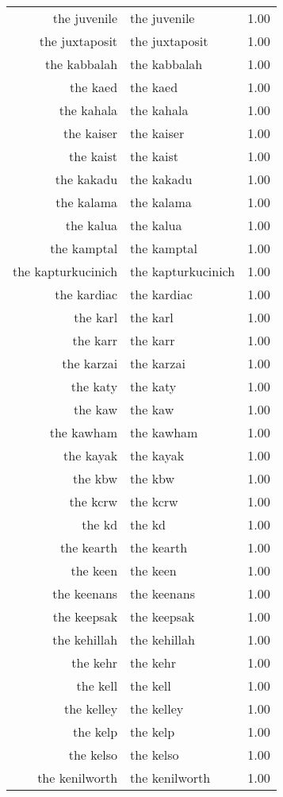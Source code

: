 \begin{table}[ht]
\begin{tabular}{rlr}
  the juvenile & the juvenile & 1.00 \\ 
  the juxtaposit & the juxtaposit & 1.00 \\ 
  the kabbalah & the kabbalah & 1.00 \\ 
  the kaed & the kaed & 1.00 \\ 
  the kahala & the kahala & 1.00 \\ 
  the kaiser & the kaiser & 1.00 \\ 
  the kaist & the kaist & 1.00 \\ 
  the kakadu & the kakadu & 1.00 \\ 
  the kalama & the kalama & 1.00 \\ 
  the kalua & the kalua & 1.00 \\ 
  the kamptal & the kamptal & 1.00 \\ 
  the kapturkucinich & the kapturkucinich & 1.00 \\ 
  the kardiac & the kardiac & 1.00 \\ 
  the karl & the karl & 1.00 \\ 
  the karr & the karr & 1.00 \\ 
  the karzai & the karzai & 1.00 \\ 
  the katy & the katy & 1.00 \\ 
  the kaw & the kaw & 1.00 \\ 
  the kawham & the kawham & 1.00 \\ 
  the kayak & the kayak & 1.00 \\ 
  the kbw & the kbw & 1.00 \\ 
  the kcrw & the kcrw & 1.00 \\ 
  the kd & the kd & 1.00 \\ 
  the kearth & the kearth & 1.00 \\ 
  the keen & the keen & 1.00 \\ 
  the keenans & the keenans & 1.00 \\ 
  the keepsak & the keepsak & 1.00 \\ 
  the kehillah & the kehillah & 1.00 \\ 
  the kehr & the kehr & 1.00 \\ 
  the kell & the kell & 1.00 \\ 
  the kelley & the kelley & 1.00 \\ 
  the kelp & the kelp & 1.00 \\ 
  the kelso & the kelso & 1.00 \\ 
  the kenilworth & the kenilworth & 1.00 \\ 

\end{tabular}
\end{table}
